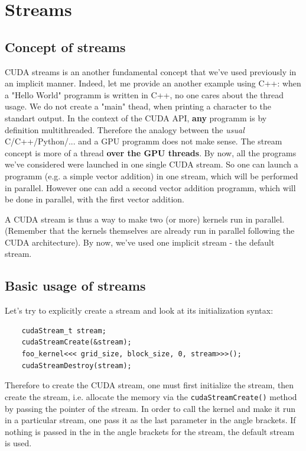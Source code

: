 \section{Streams}
\label{sec:streams}
\subsection{Concept of streams}
CUDA streams is an another fundamental concept that we've used previously in an implicit manner.
Indeed, let me provide an another example using C++: when a "Hello World" programm is written in C++, 
no one cares about the thread usage. We do not create a "main" thead, when printing a character to 
the standart output. In the context of the CUDA API, \textbf{any} programm is by definition multithreaded. 
Therefore the analogy between the \textit{usual} C/C++/Python/... and a GPU programm does not make sense.
The stream concept is more of a thread \textbf{over the GPU threads}. 
By now, all the programs we've considered were launched in one single CUDA stream. So one can launch a 
programm (e.g. a simple vector addition) in one stream, which will be performed in parallel. However one can 
add a second vector addition programm, which will be done in parallel, with the first vector addition.



A CUDA stream is thus a way to make two (or more) kernels run in parallel. (Remember that the kernels 
themselves are already run in parallel following the CUDA architecture). By now, we've used one implicit stream - the default stream.

\subsection{Basic usage of streams}
Let's try to explicitly create a stream and look at its initialization syntax:

\begin{listing}[ht!]
\begin{verbatim}
    cudaStream_t stream;
    cudaStreamCreate(&stream);
    foo_kernel<<< grid_size, block_size, 0, stream>>>();
    cudaStreamDestroy(stream);
\end{verbatim}
\end{listing}

Therefore to create the CUDA stream, one must first initialize the stream, then create the stream, i.e. 
allocate the memory via the \verb|cudaStreamCreate()| method by passing the pointer of the stream. 
In order to call the kernel and make it run in a particular stream, one pass it as the last parameter in the angle brackets.
If nothing is passed in the in the angle brackets for the stream, the default stream is used.

